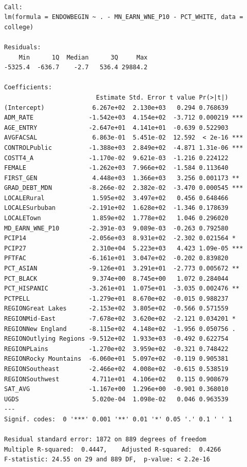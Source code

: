\documentclass[
  letterpaper,
  DIV=11,
  numbers=noendperiod]{scrartcl}
\begin{document}
\begin{verbatim}

Call:
lm(formula = ENDOWBEGIN ~ . - MN_EARN_WNE_P10 - PCT_WHITE, data = college)

Residuals:
    Min      1Q  Median      3Q     Max 
-5325.4  -636.7    -2.7   536.4 29884.2 

Coefficients:
                         Estimate Std. Error t value Pr(>|t|)    
(Intercept)             6.267e+02  2.130e+03   0.294 0.768639    
ADM_RATE               -1.542e+03  4.154e+02  -3.712 0.000219 ***
AGE_ENTRY              -2.647e+01  4.141e+01  -0.639 0.522903    
AVGFACSAL               6.863e-01  5.451e-02  12.592  < 2e-16 ***
CONTROLPublic          -1.388e+03  2.849e+02  -4.871 1.31e-06 ***
COSTT4_A               -1.170e-02  9.621e-03  -1.216 0.224122    
FEMALE                 -1.262e+03  7.966e+02  -1.584 0.113640    
FIRST_GEN               4.448e+03  1.366e+03   3.256 0.001173 ** 
GRAD_DEBT_MDN          -8.266e-02  2.382e-02  -3.470 0.000545 ***
LOCALERural             1.595e+02  3.497e+02   0.456 0.648466    
LOCALESurbuban         -2.191e+02  1.628e+02  -1.346 0.178639    
LOCALETown              1.859e+02  1.778e+02   1.046 0.296020    
MD_EARN_WNE_P10        -2.391e-03  9.089e-03  -0.263 0.792580    
PCIP14                 -2.056e+03  8.931e+02  -2.302 0.021564 *  
PCIP27                  2.310e+04  5.223e+03   4.423 1.09e-05 ***
PFTFAC                 -6.161e+01  3.047e+02  -0.202 0.839820    
PCT_ASIAN              -9.126e+01  3.291e+01  -2.773 0.005672 ** 
PCT_BLACK               9.374e+00  8.745e+00   1.072 0.284044    
PCT_HISPANIC           -3.261e+01  1.075e+01  -3.035 0.002476 ** 
PCTPELL                -1.279e+01  8.670e+02  -0.015 0.988237    
REGIONGreat Lakes      -2.153e+02  3.805e+02  -0.566 0.571559    
REGIONMid-East         -7.678e+02  3.620e+02  -2.121 0.034201 *  
REGIONNew England      -8.115e+02  4.148e+02  -1.956 0.050756 .  
REGIONOutlying Regions -9.512e+02  1.933e+03  -0.492 0.622754    
REGIONPLains           -1.270e+02  3.959e+02  -0.321 0.748422    
REGIONRocky Mountains  -6.060e+01  5.097e+02  -0.119 0.905381    
REGIONSoutheast        -2.466e+02  4.008e+02  -0.615 0.538519    
REGIONSouthwest         4.711e+01  4.106e+02   0.115 0.908679    
SAT_AVG                -1.167e+00  1.296e+00  -0.901 0.368010    
UGDS                    5.020e-04  1.098e-02   0.046 0.963539    
---
Signif. codes:  0 '***' 0.001 '**' 0.01 '*' 0.05 '.' 0.1 ' ' 1

Residual standard error: 1872 on 889 degrees of freedom
Multiple R-squared:  0.4447,    Adjusted R-squared:  0.4266 
F-statistic: 24.55 on 29 and 889 DF,  p-value: < 2.2e-16
\end{verbatim}
\end{document}
